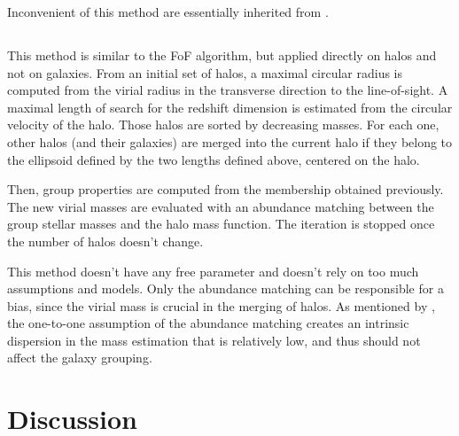 Inconvenient of this method are essentially inherited from \citet{Yang+07}.

\subsection{\citet{MunozCuartas+12}}
\label{sub:munozcuartas12}

This method is similar to the FoF algorithm, but applied directly on halos and
not on galaxies. From an initial set of halos, a maximal circular radius is
computed from the virial radius in the transverse direction to the
line-of-sight. A maximal length of search for the redshift dimension is
estimated from the circular velocity of the halo. Those halos are sorted by
decreasing masses. For each one, other halos (and their galaxies) are merged
into the current halo if they belong to the ellipsoid defined by the two
lengths defined above, centered on the halo.

Then, group properties are computed from the membership obtained previously.
The new virial masses are evaluated with an abundance matching between the
group stellar masses and the halo mass function. The iteration is stopped once
the number of halos doesn't change.

This method doesn't have any free parameter and doesn't rely on too much
assumptions and models. Only the abundance matching can be responsible for a
bias, since the virial mass is crucial in the merging of halos. As mentioned by
\citet{Yang+07}, the one-to-one assumption of the abundance matching creates an
intrinsic dispersion in the mass estimation that is relatively low, and thus
should not affect the galaxy grouping.

\section{Discussion}
\label{sec:gga_discussion}



